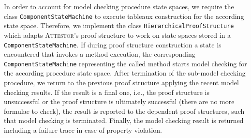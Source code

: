 \documentclass[a4paper, 12pt, twoside]{report}
\begin{document}
	In order to account for model checking procedure state spaces, we require the class \texttt{ComponentStateMachine} to execute tableaux construction for the according state space. Therefore, we implement the class \texttt{HierarchicalProofStructure} which adapts \textsc{Attestor}'s proof structure to work on state spaces stored in a \texttt{ComponentStateMachine}. If during proof structure construction a state is encountered that invokes a method execution, the corresponding \texttt{ComponentStateMachine} representing the called method starts model checking for the according procedure state space. After termination of the sub-model checking procedure, we return to the previous proof structure applying the recent model checking results. If the result is a final one, i.e., the proof structure is unsuccessful or the proof structure is ultimately successful (there are no more formulae to check), the result is reported to the dependent proof structures, such that model checking is terminated. Finally, the model checking result is returned including a failure trace in case of property violation.\\
	
\end{document}
